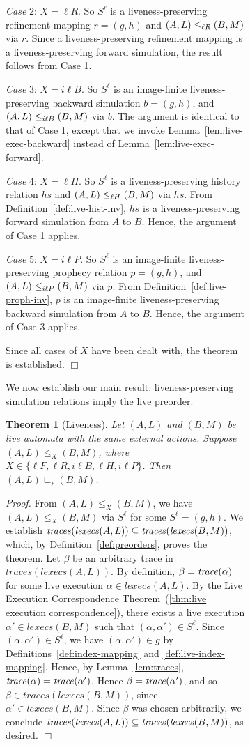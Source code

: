 \documentclass[11pt]{article}
\newcommand{\bt}{\begin{theorem}}
\newcommand{\et}{\end{theorem}}
\newcommand{\bpr}{\begin{proof}}
\newcommand{\epr}{\end{proof}}
\renewcommand{\l}{\ell}
\newcommand{\al}{\alpha}
\newcommand{\execs}{\mathit{lexecs}}
\newcommand{\traces}{\mathit{traces}}
\newcommand{\lpreorder}{\sqsubseteq_\l}	\newcommand{\spreorder}{\sqsubseteq_s}	\newcommand{\simu}{\leq}
\newtheorem{theorem}{Theorem}
\newcommand{\case}[2]{\vspace{1.5ex} \noindent \textit{Case} #1: #2.}
\newenvironment{proof}{\vspace{-1.0ex}\textit{Proof.} }
                      {\hfill{$\Box$}}
\begin{document}
\begin{figure}[htb]
\begin{figure}[htb]
\case{2}{$X = \l R$} So $S^\l$ is a liveness-preserving refinement mapping 
$r = (g,h)$ and $(A,L) \lprm (B,M)$ via $r$.
Since a liveness-preserving refinement mapping is a liveness-preserving forward
simulation, the result follows from Case 1.


\case{3}{$X = i \l B$} So $S^\l$ is an image-finite 
liveness-preserving backward simulation 
$b = (g,h)$, and $(A,L) \ilpbs (B,M)$ via $b$.
The argument is identical to that of Case 1, except that we invoke 
Lemma~\ref{lem:live-exec-backward} instead of Lemma~\ref{lem:live-exec-forward}.


\case{4}{$X = \l H$} So $S^\l$ is a
liveness-preserving history relation $hs$
and $(A,L) \lphr (B,M)$ via $hs$.
From Definition~\ref{def:live-hist-inv}, $hs$ is a 
liveness-preserving forward simulation from $A$ to $B$.
Hence, the argument of Case 1 applies.


\case{5}{$X = i \l P$} So $S^\l$ is an image-finite 
liveness-preserving prophecy relation
$p = (g,h)$, and $(A,L) \ilppr (B,M)$ via $p$.
From Definition~\ref{def:live-proph-inv}, $p$ is an 
image-finite liveness-preserving backward simulation from $A$ to $B$.
Hence, the argument of Case 3 applies.

Since all cases of $X$ have been dealt with, the theorem is established.
\epr






We now establish our main result: liveness-preserving 
simulation relations imply the live preorder.


\bt [Liveness]
Let $(A,L)$ and $(B,M)$ be live automata with the same external actions.
Suppose $(A,L) \simu_X (B,M)$, where 
$X \in \{\l F, \l R, i\l B, \l H, i\l P\}$.
Then $(A, L) \lpreorder (B, M)$.
\label{thm:liveness}
\et
\bpr
From $(A,L) \simu_X (B,M)$, we have $(A,L) \simu_X (B,M)$ via $S^\l$ for some
$S^\l = (g,h)$.  We establish 
	$\traces(\execs(A,L)) \sub \traces(\execs(B,M))$,
which, by Definition~\ref{def:preorders}, proves the theorem.
Let $\beta$ be an arbitrary trace in $\traces(\execs(A,L))$. By
definition, $\beta = \mathit{trace}(\alpha)$ for some live execution
$\al \in \execs(A,L)$.
By the Live Execution Correspondence Theorem~(\ref{thm:live
execution correspondence}), there exists a live execution 
$\al' \in \execs(B,M)$
such that $(\al, \al') \in S^\l$. Since $(\al, \al') \in S^\l$, we have
$(\al, \al') \in g$ by Definitions~\ref{def:index-mapping} and
\ref{def:live-index-mapping}.  Hence, by Lemma~\ref{lem:traces}, $\trace(\al)
= \trace(\al')$.  Hence $\beta = \trace(\al')$, and so $\beta \in
\traces(\execs(B,M))$, since $\al' \in \execs(B,M)$.
Since $\beta$ was chosen arbitrarily, we conclude
$\traces(\execs(A,L)) \sub \traces(\execs(B,M))$, as desired.
\epr







\end{figure}
\end{figure}
\end{document}
